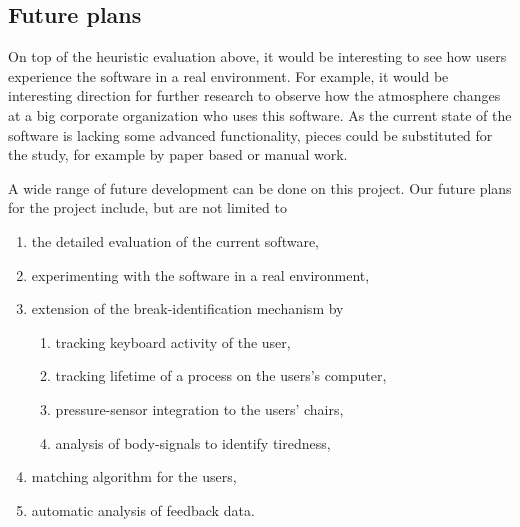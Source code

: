 \subsection{Future plans}
On top of the heuristic evaluation above, it would be interesting to see how users experience the software in a real environment. For example, it would be interesting direction for further research to observe how the atmosphere changes at a big corporate organization who uses this software. As the current state of the software is lacking some advanced functionality, pieces could be substituted for the study, for example by paper based or manual work. 

A wide range of future development can be done on this project. Our future plans for the project include, but are not limited to 
\begin{enumerate}
	\item the detailed evaluation of the current software,
	\item experimenting with the software in a real environment,
	\item extension of the break-identification mechanism by
		\begin{enumerate}
			\item tracking keyboard activity of the user,
			\item tracking lifetime of a process on the users's computer,
			\item pressure-sensor integration to the users' chairs,
			\item analysis of body-signals to identify tiredness,
		\end{enumerate}
	\item matching algorithm for the users,
	\item automatic analysis of feedback data.
\end{enumerate}